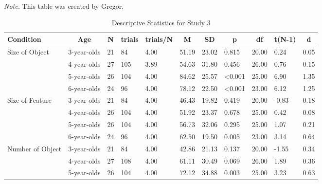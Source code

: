 \documentclass[
  man]{apa6}
\begin{document}
\begin{landscape}
\begin{table}[tbp]
\begin{center}
\begin{threeparttable}
\begin{tablenotes}[para]
\normalsize{\textit{Note.} This table was created by Gregor.}
\end{tablenotes}

\end{threeparttable}
\end{center}

\end{table}


\begin{table}[tbp]

\begin{center}
\begin{threeparttable}

\caption{\label{tab:s3_testtables}Descriptive Statistics for Study 3}

\begin{tabular}{lllllllllll}
\toprule
Condition & \multicolumn{1}{c}{Age} & \multicolumn{1}{c}{N} & \multicolumn{1}{c}{trials} & \multicolumn{1}{c}{trials/N} & \multicolumn{1}{c}{M} & \multicolumn{1}{c}{SD} & \multicolumn{1}{c}{p} & \multicolumn{1}{c}{df} & \multicolumn{1}{c}{t(N-1)} & \multicolumn{1}{c}{d}\\
\midrule
Size of Object & 3-year-olds & 21 & 84 & 4.00 & 51.19 & 23.02 & 0.815 & 20.00 & 0.24 & 0.05\\
 & 4-year-olds & 27 & 105 & 3.89 & 54.63 & 31.80 & 0.456 & 26.00 & 0.76 & 0.15\\
 & 5-year-olds & 26 & 104 & 4.00 & 84.62 & 25.57 & <0.001 & 25.00 & 6.90 & 1.35\\
 & 6-year-olds & 24 & 96 & 4.00 & 78.12 & 22.50 & <0.001 & 23.00 & 6.12 & 1.25\\
Size of Feature & 3-year-olds & 21 & 84 & 4.00 & 46.43 & 19.82 & 0.419 & 20.00 & -0.83 & 0.18\\
 & 4-year-olds & 26 & 104 & 4.00 & 51.92 & 23.37 & 0.678 & 25.00 & 0.42 & 0.08\\
 & 5-year-olds & 26 & 104 & 4.00 & 56.73 & 32.06 & 0.295 & 25.00 & 1.07 & 0.21\\
 & 6-year-olds & 24 & 96 & 4.00 & 62.50 & 19.50 & 0.005 & 23.00 & 3.14 & 0.64\\
Number of Object & 3-year-olds & 21 & 84 & 4.00 & 42.86 & 21.13 & 0.137 & 20.00 & -1.55 & 0.34\\
 & 4-year-olds & 27 & 108 & 4.00 & 61.11 & 30.49 & 0.069 & 26.00 & 1.89 & 0.36\\
 & 5-year-olds & 26 & 104 & 4.00 & 72.12 & 34.88 & 0.003 & 25.00 & 3.23 & 0.63\\

\end{tabular}
\end{threeparttable}
\end{center}
\end{table}
\end{landscape}
\end{document}

